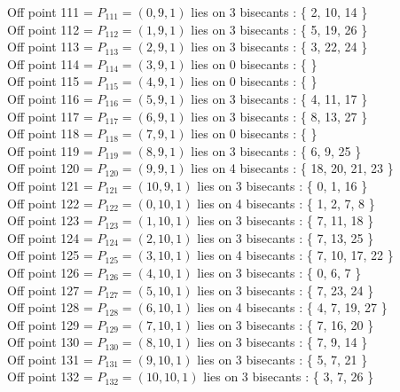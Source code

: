 \documentclass{article}
\begin{document}
{Off point 111 = $P_{111} = ( 0, 9, 1 )$ lies on 3 bisecants : \{ 2, 10, 14 \}\\
Off point 112 = $P_{112} = ( 1, 9, 1 )$ lies on 3 bisecants : \{ 5, 19, 26 \}\\
Off point 113 = $P_{113} = ( 2, 9, 1 )$ lies on 3 bisecants : \{ 3, 22, 24 \}\\
Off point 114 = $P_{114} = ( 3, 9, 1 )$ lies on 0 bisecants : \{  \}\\
Off point 115 = $P_{115} = ( 4, 9, 1 )$ lies on 0 bisecants : \{  \}\\
Off point 116 = $P_{116} = ( 5, 9, 1 )$ lies on 3 bisecants : \{ 4, 11, 17 \}\\
Off point 117 = $P_{117} = ( 6, 9, 1 )$ lies on 3 bisecants : \{ 8, 13, 27 \}\\
Off point 118 = $P_{118} = ( 7, 9, 1 )$ lies on 0 bisecants : \{  \}\\
Off point 119 = $P_{119} = ( 8, 9, 1 )$ lies on 3 bisecants : \{ 6, 9, 25 \}\\
Off point 120 = $P_{120} = ( 9, 9, 1 )$ lies on 4 bisecants : \{ 18, 20, 21, 23 \}\\
Off point 121 = $P_{121} = ( 10, 9, 1 )$ lies on 3 bisecants : \{ 0, 1, 16 \}\\
Off point 122 = $P_{122} = ( 0, 10, 1 )$ lies on 4 bisecants : \{ 1, 2, 7, 8 \}\\
Off point 123 = $P_{123} = ( 1, 10, 1 )$ lies on 3 bisecants : \{ 7, 11, 18 \}\\
Off point 124 = $P_{124} = ( 2, 10, 1 )$ lies on 3 bisecants : \{ 7, 13, 25 \}\\
Off point 125 = $P_{125} = ( 3, 10, 1 )$ lies on 4 bisecants : \{ 7, 10, 17, 22 \}\\
Off point 126 = $P_{126} = ( 4, 10, 1 )$ lies on 3 bisecants : \{ 0, 6, 7 \}\\
Off point 127 = $P_{127} = ( 5, 10, 1 )$ lies on 3 bisecants : \{ 7, 23, 24 \}\\
Off point 128 = $P_{128} = ( 6, 10, 1 )$ lies on 4 bisecants : \{ 4, 7, 19, 27 \}\\
Off point 129 = $P_{129} = ( 7, 10, 1 )$ lies on 3 bisecants : \{ 7, 16, 20 \}\\
Off point 130 = $P_{130} = ( 8, 10, 1 )$ lies on 3 bisecants : \{ 7, 9, 14 \}\\
Off point 131 = $P_{131} = ( 9, 10, 1 )$ lies on 3 bisecants : \{ 5, 7, 21 \}\\
Off point 132 = $P_{132} = ( 10, 10, 1 )$ lies on 3 bisecants : \{ 3, 7, 26 \}\\
}
\end{document}
